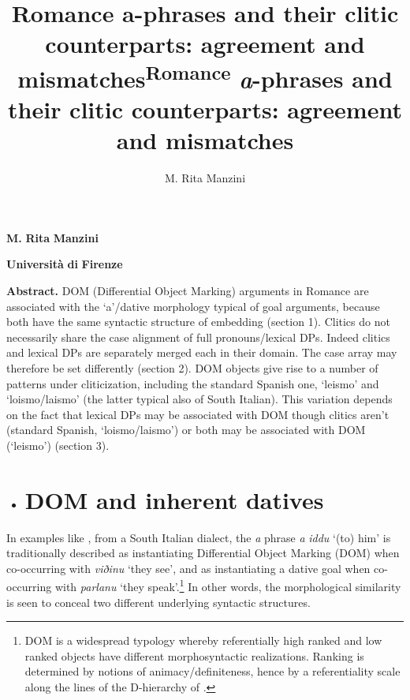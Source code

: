 \documentclass[output=paper,nonflat,modfonts]{langsci/langscibook}
\author{M. Rita Manzini\affiliation{}}
\title{Romance a-phrases and their clitic counterparts: agreement and mismatches}
\author{\affiliation{}\orcid{}}
\title{}
\begin{document}
\maketitle 

\title{\textsuperscript{Romance} \textit{a}{}-phrases and their clitic counterparts: agreement and mismatches}

\textbf{M.} \textbf{Rita} \textbf{Manzini}

 \textbf{Università} \textbf{di} \textbf{Firenze}

\begin{stylelsAbstract}
\textbf{Abstract.} DOM (Differential Object Marking) arguments in Romance are associated with the ‘a’/dative morphology typical of goal arguments, because both have the same syntactic structure of embedding (section 1). Clitics do not necessarily share the case alignment of full pronouns/lexical DPs. Indeed clitics and lexical DPs are separately merged each in their domain. The case array may therefore be set differently (section 2). DOM objects give rise to a number of patterns under cliticization, including the standard Spanish one, ‘leismo’ and ‘loismo/laismo’ (the latter typical also of South Italian). This variation depends on the fact that lexical DPs may be associated with DOM though clitics aren’t (standard Spanish, ‘loismo/laismo’) or both may be associated with DOM (‘leismo’) (section 3). 
\end{stylelsAbstract}

\begin{itemize}
\item \section{DOM and inherent datives}
\end{itemize}

In examples like , from a South Italian dialect, the \textit{a} phrase \textit{a} \textit{iddu} ‘(to) him’ is traditionally described as instantiating Differential Object Marking (DOM) when co-occurring with \textit{viðinu} ‘they see’, and as instantiating a dative goal when co-occurring with \textit{parlanu} ‘they speak’.\footnote{DOM is a widespread typology \citep{Bossong1985} whereby referentially high ranked and low ranked objects have different morphosyntactic realizations. Ranking is determined by notions of animacy/definiteness, hence by a referentiality scale along the lines of the D-hierarchy of \citet{Kiparsky2008}.}   In other words, the morphological similarity is seen to conceal two different underlying syntactic structures.
\end{document}

